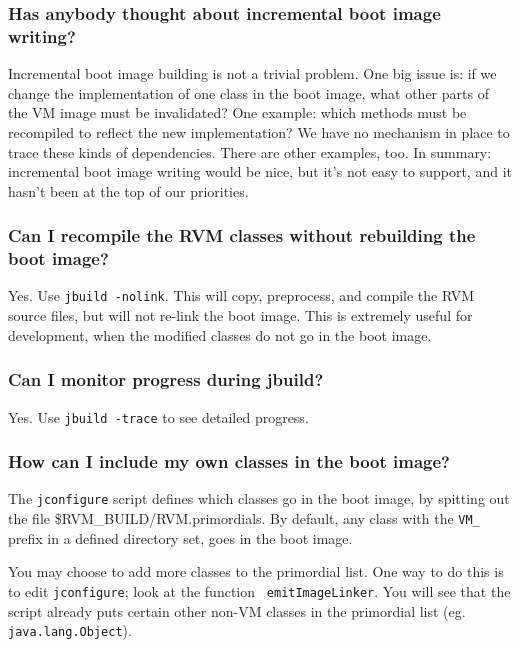 \subsubsection{Has anybody thought about incremental boot image writing?}

Incremental boot image building is not a trivial problem.  One big
issue is: if we change the implementation of one class in the boot image,
what other parts of the VM image must be invalidated?  One example: which
methods must be recompiled to reflect the new implementation?  We have no
mechanism in place to trace these kinds of dependencies.  There are other
examples, too.  In summary: incremental boot image writing would be nice,
but it's not easy to support, and it hasn't been at the top of our
priorities.

\subsubsection{Can I recompile the RVM classes without rebuilding the boot
image?}

Yes.  Use {\tt jbuild -nolink}. This will copy, preprocess, and compile
the RVM source files, but will not re-link the boot image.  This is
extremely useful for development, when the modified classes do not go in
the boot image.

\subsubsection{Can I monitor progress during jbuild?}

Yes.  Use {\tt jbuild -trace} to see detailed progress. 

\subsubsection{How can I include my own classes in the boot image?}

The {\tt jconfigure} script defines which classes go in the boot image, by
spitting out the file {\$RVM\_BUILD/RVM.primordials}.  By default, any
class with the {\tt VM\_} prefix in a defined directory set, goes in the
boot image.

You may choose to add more classes to the primordial list.  One way to do
this is to edit {\tt jconfigure}; look at the function {\tt
emitImageLinker}.  You will see that the script already puts certain other
non-VM classes in the primordial list (eg. {\tt java.lang.Object}).

\AIXTMFooter

